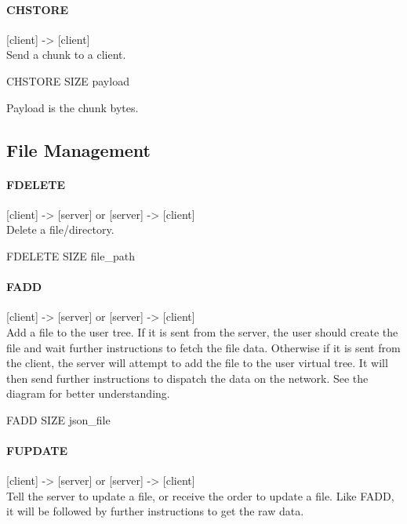 \documentclass{article}
\begin{document}
\paragraph{CHSTORE}
[client] -> [client]\\
Send a chunk to a client.

\begin{center}CHSTORE SIZE payload\end{center}

Payload is the chunk bytes.

\subsection{File Management}

\paragraph{FDELETE}

[client] -> [server] or [server] -> [client] \\
Delete a file/directory.\\

\begin{center}FDELETE SIZE file\_path\end{center}

\paragraph{FADD}

[client] -> [server] or [server] -> [client] \\

Add a file to the user tree. If it is sent from the server, the user should create the file and wait further instructions to fetch the file data. Otherwise if it is sent from the client, the server will attempt to add the file to the user virtual tree. It will then send further instructions to dispatch the data on the network. See the diagram for better understanding.\\

\begin{center}FADD SIZE json\_file\end{center}

\paragraph{FUPDATE}

[client] -> [server] or [server] -> [client] \\
Tell the server to update a file, or receive the order to update a file. Like FADD, it will be followed by further instructions to get the raw data.
\end{document}
